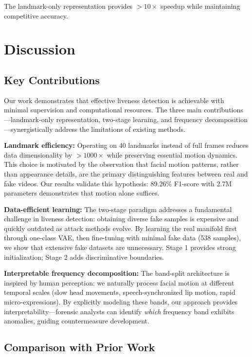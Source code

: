 \documentclass{article}
\begin{document}
The landmark-only representation provides $>10\times$ speedup while maintaining competitive accuracy.

\section{Discussion}
\label{sec:discussion}

\subsection{Key Contributions}

Our work demonstrates that effective liveness detection is achievable with minimal supervision and computational resources. The three main contributions—landmark-only representation, two-stage learning, and frequency decomposition—synergistically address the limitations of existing methods.

\textbf{Landmark efficiency:} Operating on 40 landmarks instead of full frames reduces data dimensionality by $>1000\times$ while preserving essential motion dynamics. This choice is motivated by the observation that facial motion patterns, rather than appearance details, are the primary distinguishing features between real and fake videos. Our results validate this hypothesis: 89.26\% F1-score with 2.7M parameters demonstrates that motion alone suffices.

\textbf{Data-efficient learning:} The two-stage paradigm addresses a fundamental challenge in liveness detection: obtaining diverse fake samples is expensive and quickly outdated as attack methods evolve. By learning the real manifold first through one-class VAE, then fine-tuning with minimal fake data (538 samples), we show that extensive fake datasets are unnecessary. Stage 1 provides strong initialization; Stage 2 adds discriminative boundaries.

\textbf{Interpretable frequency decomposition:} The band-split architecture is inspired by human perception: we naturally process facial motion at different temporal scales (slow head movements, speech-synchronized lip motion, rapid micro-expressions). By explicitly modeling these bands, our approach provides interpretability—forensic analysts can identify \emph{which} frequency band exhibits anomalies, guiding countermeasure development.

\subsection{Comparison with Prior Work}
\end{document}
